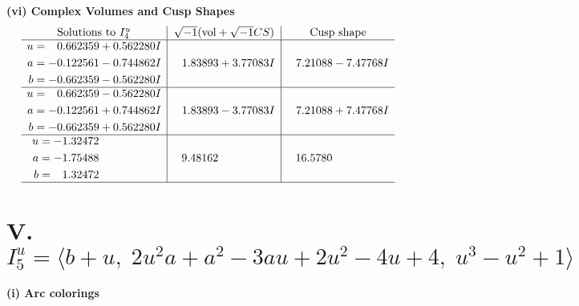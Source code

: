 \documentclass[1p]{elsarticle_modified}
\theoremstyle{definition}
\newcommand{\I}{\sqrt{-1}}
\begin{document}
\newpage\flushleft \textbf{(vi) Complex Volumes and Cusp Shapes}
$$\begin{array}{c|c|c}  
\text{Solutions to }I^u_{4}& \I (\text{vol} + \sqrt{-1}CS) & \text{Cusp shape}\\
 \hline 
\begin{aligned}
u &= \phantom{-}0.662359 + 0.562280 I \\
a &= -0.122561 - 0.744862 I \\
b &= -0.662359 - 0.562280 I\end{aligned}
 & \phantom{-}1.83893 + 3.77083 I & \phantom{-}7.21088 - 7.47768 I \\ \hline\begin{aligned}
u &= \phantom{-}0.662359 - 0.562280 I \\
a &= -0.122561 + 0.744862 I \\
b &= -0.662359 + 0.562280 I\end{aligned}
 & \phantom{-}1.83893 - 3.77083 I & \phantom{-}7.21088 + 7.47768 I \\ \hline\begin{aligned}
u &= -1.32472\phantom{ +0.000000I} \\
a &= -1.75488\phantom{ +0.000000I} \\
b &= \phantom{-}1.32472\phantom{ +0.000000I}\end{aligned}
 & \phantom{-}9.48162\phantom{ +0.000000I} & \phantom{-}16.5780\phantom{ +0.000000I}\\
 \hline 
 \end{array}$$\newpage\newpage\renewcommand{\arraystretch}{1}
\centering \section*{V. $I^u_{5}= \langle b+u,\;2 u^2 a+a^2-3 a u+2 u^2-4 u+4,\;u^3- u^2+1 \rangle$}
\flushleft \textbf{(i) Arc colorings}\\
\end{document}
